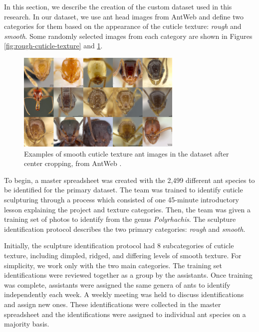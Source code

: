 \documentclass{aci}
\numberwithin{equation}{section}
\begin{document}
In this section, we describe the creation of the custom dataset used in this
research. In our dataset, we use ant head images from AntWeb
\cite{perrichot_antweb_2012} and define two categories for them based on the
appearance of the cuticle texture: \textit{rough} and \textit{smooth}. Some
randomly selected images from each category are shown in Figures
\ref{fig:rough-cuticle-texture} and \ref{fig:smooth-cuticle-texture}.

\begin{figure}
    \centering
    \includegraphics[width=0.7\textwidth]{thesis_assets/images/smooth_collage.png}
    \caption{Examples of smooth cuticle texture ant images in the dataset after
        center cropping, from AntWeb \cite{perrichot_antweb_2012}.}
    \label{fig:smooth-cuticle-texture}
\end{figure}


To begin, a master spreadsheet was created with the 2,499 different ant species
to be identified for the primary dataset. The team was trained to identify
cuticle sculpturing through a process which consisted of one 45-minute
introductory lesson explaining the project and texture categories. Then, the
team was given a training set of photos to identify from the genus
\textit{Polyrhachis}. The sculpture identification protocol describes the two
primary categories: \textit{rough} and \textit{smooth}.

Initially, the sculpture identification protocol had 8 subcategories of cuticle
texture, including dimpled, ridged, and differing levels of smooth texture. For
simplicity, we work only with the two main categories. The training set
identifications were reviewed together as a group by the assistants. Once
training was complete, assistants were assigned the same genera of ants to
identify independently each week. A weekly meeting was held to discuss
identifications and assign new ones. These identifications were collected in the
master spreadsheet and the identifications were assigned to individual ant
species on a majority basis.
\end{document}
